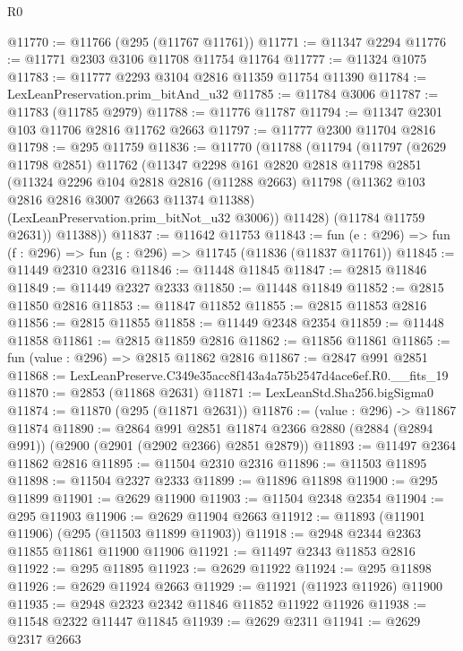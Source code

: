 \begin{lexlean}{R0}
\begin{coremodule}
@11770 := @11766 (@295 (@11767 @11761))
@11771 := @11347 @2294
@11776 := @11771 @2303 @3106 @11708 @11754 @11764
@11777 := @11324 @1075
@11783 := @11777 @2293 @3104 @2816 @11359 @11754 @11390
@11784 := LexLeanPreservation.prim_bitAnd_u32
@11785 := @11784 @3006
@11787 := @11783 (@11785 @2979)
@11788 := @11776 @11787
@11794 := @11347 @2301 @103 @11706 @2816 @11762 @2663
@11797 := @11777 @2300 @11704 @2816
@11798 := @295 @11759
@11836 := @11770
    (@11788
      (@11794
        (@11797
          (@2629 @11798 @2851)
          @11762
          (@11347
            @2298
            @161
            @2820
            @2818
            @11798
            @2851
            (@11324
              @2296
              @104
              @2818
              @2816
              (@11288 @2663)
              @11798
              (@11362 @103 @2816 @2816 @3007 @2663 @11374 @11388)
              (LexLeanPreservation.prim_bitNot_u32 @3006))
            @11428)
          (@11784 @11759 @2631))
        @11388))
@11837 := @11642 @11753
@11843 := fun (e : @296) => fun (f : @296) => fun (g : @296) => @11745 (@11836 (@11837 @11761))
@11845 := @11449 @2310 @2316
@11846 := @11448 @11845
@11847 := @2815 @11846
@11849 := @11449 @2327 @2333
@11850 := @11448 @11849
@11852 := @2815 @11850 @2816
@11853 := @11847 @11852
@11855 := @2815 @11853 @2816
@11856 := @2815 @11855
@11858 := @11449 @2348 @2354
@11859 := @11448 @11858
@11861 := @2815 @11859 @2816
@11862 := @11856 @11861
@11865 := fun (value : @296) => @2815 @11862 @2816
@11867 := @2847 @991 @2851
@11868 := LexLeanPreserve.C349e35acc8f143a4a75b2547d4ace6ef.R0.__fits_19
@11870 := @2853 (@11868 @2631)
@11871 := LexLeanStd.Sha256.bigSigma0
@11874 := @11870 (@295 (@11871 @2631))
@11876 := (value : @296) -> @11867 @11874
@11890 := @2864
    @991
    @2851
    @11874
    @2366
    @2880
    (@2884 (@2894 @991))
    (@2900 (@2901 (@2902 @2366) @2851 @2879))
@11893 := @11497 @2364 @11862 @2816
@11895 := @11504 @2310 @2316
@11896 := @11503 @11895
@11898 := @11504 @2327 @2333
@11899 := @11896 @11898
@11900 := @295 @11899
@11901 := @2629 @11900
@11903 := @11504 @2348 @2354
@11904 := @295 @11903
@11906 := @2629 @11904 @2663
@11912 := @11893 (@11901 @11906) (@295 (@11503 @11899 @11903))
@11918 := @2948 @2344 @2363 @11855 @11861 @11900 @11906
@11921 := @11497 @2343 @11853 @2816
@11922 := @295 @11895
@11923 := @2629 @11922
@11924 := @295 @11898
@11926 := @2629 @11924 @2663
@11929 := @11921 (@11923 @11926) @11900
@11935 := @2948 @2323 @2342 @11846 @11852 @11922 @11926
@11938 := @11548 @2322 @11447 @11845
@11939 := @2629 @2311
@11941 := @2629 @2317 @2663

\end{coremodule}
\end{lexlean}
